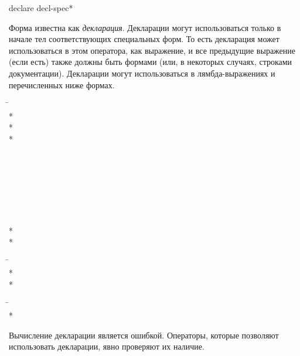 \begin{defspec}
declare {decl-spec}*

Форма  известна как \emph{декларация}.
Декларации могут использоваться только в начале тел соответствующих специальных
форм. То есть декларация может использоваться в этом оператора, как
выражение, и все предыдущие  выражение (если есть) также должны быть формами
 (или, в некоторых случаях, строками документации).
Декларации могут использоваться в лямбда-выражениях и перечисленных ниже формах.
\begin{lisp}
\hskip 12pc\=\kill
{}\> \\*
\> \\*
\> \\*
\> \\
\> \\
\> \\
\> \\
\> \\
\> \\
\> \\
\> \\*
\> \\*
\> \\
\>
\end{lisp}

\begin{lisp}
\hskip 12pc\=\kill
{}\> \\*
\\*
\end{lisp}

\begin{lisp}
\hskip 12pc\=\kill
{}\> \\*
\end{lisp}

Вычисление декларации является ошибкой. Операторы, которые позволяют
использовать декларации, явно проверяют их наличие.


\end{defspec}
